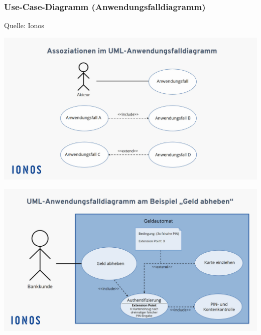 
\subsubsection{Use-Case-Diagramm (Anwendungsfalldiagramm)}
\label{sec:UseCaseDiagramm}

Quelle: Ionos \cite{IonosUseCase}

\begin{center}
	\includegraphics[scale=.25]{Bilder/UseCaseDiagram.png}
	
	\includegraphics[scale=.25]{Bilder/UseCaseDiagramBeispiel.png}
\end{center}


